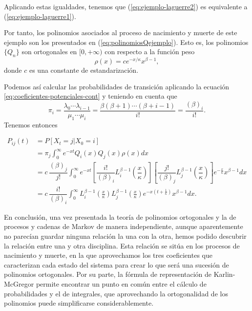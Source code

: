 \begin{ejemplo}
    Aplicando estas igualdades, tenemos que (\ref{eq:ejemplo-laguerre2}) es equivalente a (\ref{eq:ejemplo-laguerre1}).

    Por tanto, los polinomios asociados al proceso de nacimiento y muerte de este ejemplo son los presentados en (\ref{eq:polinomiosQejemplo}). Esto es, los polinomios $\{Q_n\}$ son ortogonales en $[0,+\infty)$ con respecto a la función peso 
    $$
    \rho(x) = ce^{-x/\kappa} x^{\beta-1},
    $$
    donde $c$ es una constante de estandarización.

    Podemos así calcular las probabilidades de transición aplicando la ecuación \eqref{eq:coeficientes-potenciales-cont} y teniendo en cuenta que
    $$
        \pi_i = \dfrac{\lambda_0\cdots \lambda_{i-1}}{\mu_1\cdots \mu_i} = \dfrac{\beta(\beta+1)\cdots (\beta+i-1)}{i!} = \dfrac{(\beta)_i}{i!}.
    $$
    Tenemos entonces

    \begin{equation*}
        \begin{split}
            P_{ij}(t) &= P[X_t = j|X_0=i] \\
            &= \pi_j\int_0^\infty e^{-xt}Q_i(x)Q_j(x)\rho(x)dx \\
            &= c\, \dfrac{(\beta)_j}{j!}\int_0^\infty e^{-xt}\left[\dfrac{i!}{(\beta)_i} L_i^{\beta-1}\left(\dfrac{x}{\kappa}\right)\right]\left[\dfrac{j!}{(\beta)_j} L_j^{\beta-1}\left(\dfrac{x}{\kappa}\right)\right]e^{-\frac x \kappa}x^{\beta-1}dx \\
            &= c\, \dfrac{i!}{(\beta)_i}\int_0^\infty  L_i^{\beta-1}\left(\frac x \kappa\right) L_j^{\beta-1}\left(\frac x \kappa\right) e^{-x(t+\frac 1 \kappa)} x^{\beta-1} dx. 
        \end{split}
    \end{equation*}

\end{ejemplo}

En conclusión, una vez presentada la teoría de polinomios ortogonales y la de procesos y cadenas de Markov de manera independiente, aunque aparentemente no parecían guardar ninguna relación la una con la otra, hemos podido descubrir la relación entre una y otra disciplina. Esta relación se sitúa en los procesos de nacimiento y muerte, en la que aprovechamos los tres coeficientes que caracterizan cada estado del sistema para crear lo que será una sucesión de polinomios ortogonales. Por su parte, la fórmula de representación de Karlin-McGregor permite encontrar un punto en común entre el cálculo de probabilidades y el de integrales, que aprovechando la ortogonalidad de los polinomios puede simplificarse considerablemente.


